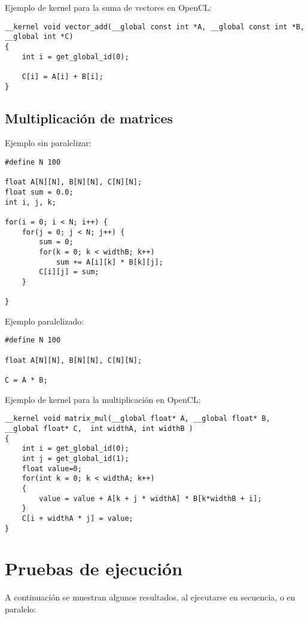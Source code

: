 \documentclass[12pt,a4paper]{article}
\begin{document}
Ejemplo de kernel para la suma de vectores en OpenCL:
\begin{lstlisting}
__kernel void vector_add(__global const int *A, __global const int *B, __global int *C)
{ 
    int i = get_global_id(0);
 
    C[i] = A[i] + B[i];
}
\end{lstlisting}
\subsection{Multiplicación de matrices}
Ejemplo sin paralelizar:
\begin{lstlisting}
#define N 100

float A[N][N], B[N][N], C[N][N];
float sum = 0.0;
int i, j, k;

for(i = 0; i < N; i++) {
	for(j = 0; j < N; j++) {
		sum = 0;
		for(k = 0; k < widthB; k++)
			sum += A[i][k] * B[k][j];
		C[i][j] = sum;
	}

}
\end{lstlisting}

Ejemplo paralelizado:
\begin{lstlisting}
#define N 100

float A[N][N], B[N][N], C[N][N];

C = A * B;
\end{lstlisting}

Ejemplo de kernel para la multiplicación en OpenCL:
\begin{lstlisting}
__kernel void matrix_mul(__global float* A, __global float* B, __global float* C,  int widthA, int widthB )
{
    int i = get_global_id(0);
    int j = get_global_id(1);
    float value=0;
    for(int k = 0; k < widthA; k++)
    {
        value = value + A[k + j * widthA] * B[k*widthB + i];
    }
    C[i + widthA * j] = value;
}
\end{lstlisting}
\section{Pruebas de ejecución}
A continuación se muestran algunos resultados, al ejecutarse en secuencia, o en
paralelo:
\end{document}
